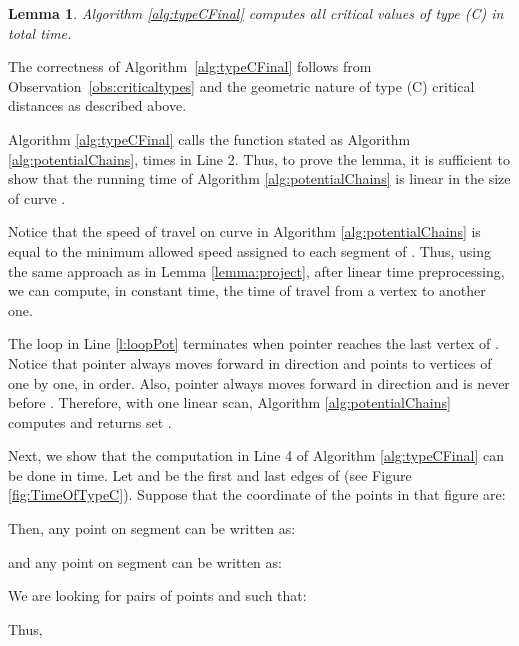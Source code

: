 \documentclass[12pt]{dalthesis}
\def\favoritefont{\bfseries \sffamily}
\def\QED{\ensuremath{{\Box}}}
\def\markatright#1{\leavevmode\unskip\nobreak\quad\hspace*{\fill}{#1}}
\newenvironment{proof}
	{\begin{trivlist}\item[\hskip\labelsep{\favoritefont Proof:}]}
	{\markatright{\QED}\end{trivlist}}
\newtheorem{lemma}[theorem]{Lemma}
\newcommand{\REM}[1]{}
\begin{document}
\begin{lemma}
\label{TimeOfTypeC}
Algorithm \ref{alg:typeCFinal} computes all critical values of type (C) 
in  total time. 
\end{lemma}

\begin{proof}
The correctness of Algorithm~\ref{alg:typeCFinal} follows from 
 Observation~\ref{obs:criticaltypes} and 
the geometric nature of type (C) critical distances
as described above. 

Algorithm \ref{alg:typeCFinal}  calls the function stated as Algorithm
\ref{alg:potentialChains},  times
in Line 2.
Thus, to prove the lemma, it is sufficient to show that 
the running time of Algorithm  \ref{alg:potentialChains} is linear in the size 
of curve .

Notice that the speed of travel on curve  in Algorithm \ref{alg:potentialChains}
is equal to the minimum allowed speed assigned to each segment of .
Thus, using the same approach as 
in Lemma \ref{lemma:project}, 
after linear time preprocessing, 
we can compute, in constant time, the time 
of travel from a vertex to another one.


The loop in Line \ref{l:loopPot} terminates  
when pointer  reaches the last vertex of .
Notice that pointer  always moves forward in direction  and 
points to vertices of  one by one, in order. Also,
pointer   always moves forward in direction  and is never 
before . Therefore, with one linear scan, 
Algorithm \ref{alg:potentialChains} computes and returns set .

Next, we show that the computation in Line 4 of 
Algorithm \ref{alg:typeCFinal} can be 
done in  time.
Let 
 and  be the first 
and last edges of 
(see Figure \ref{fig:TimeOfTypeC}).
Suppose that the coordinate of the points in that figure are:

Then, any point  on segment  can be written as:


and any point  on segment  can be written as:




We are looking for pairs of points   and  such that:






Thus,











\REM{
Replacing  by  and  by , we get:










}
\end{proof}
\end{document}
